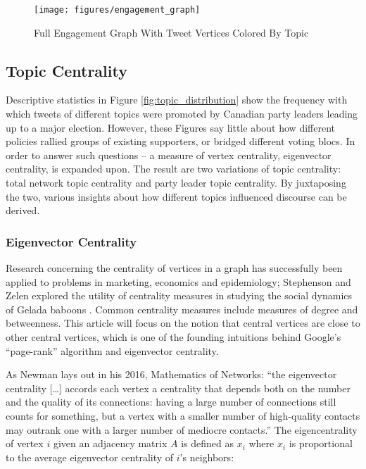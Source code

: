 \begin{figure}[h!]
  \centering
  \texttt{[image: figures/engagement\_graph]}
  \caption[Full Engagement Graph]{Full Engagement Graph With Tweet Vertices Colored By Topic}
  \label{fig:engagement_graph}
\end{figure}

\subsection{Topic Centrality}

Descriptive statistics in Figure \ref{fig:topic_distribution} show the frequency
with which tweets of different topics were promoted by Canadian party leaders
leading up to a major election. However, these Figures say little about how
different policies rallied groups of existing supporters, or bridged different
voting blocs. In order to answer such questions -- a measure of vertex
centrality, eigenvector centrality, is expanded upon. The result are two
variations of topic centrality: total network topic centrality and party
leader topic centrality. By juxtaposing the two, various insights about how
different topics influenced discourse can be derived.

\subsubsection{Eigenvector Centrality}

Research concerning the centrality of vertices in a graph has successfully been
applied to problems in marketing, economics and epidemiology; Stephenson and
Zelen explored the utility of centrality measures in studying the social
dynamics of Gelada baboons \cite{stephenson1989rethinking}. Common centrality
measures include measures of degree and betweenness. This article will focus on
the notion that central vertices are close to other central vertices, which is
one of the founding intuitions behind Google’s “page-rank” algorithm and
eigenvector centrality.

As Newman lays out in his 2016, Mathematics of Networks: ``the eigenvector
centrality [\dots] accords each vertex a centrality that depends both on the
number and the quality of its connections: having a large number of connections
still counts for something, but a vertex with a smaller number of high-quality
contacts may outrank one with a larger number of mediocre contacts.''
\cite{newman2008mathematics} The eigencentrality of vertex $i$ given an
adjacency matrix $A$ is defined as $x_i$ where $x_i$ is proportional to the
average eigenvector centrality of $i$’s neighbors:

